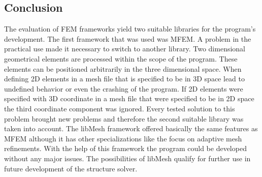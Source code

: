  \subsection{Conclusion}
  The evaluation of FEM frameworks yield two suitable libraries for the program's development. The first framework that was used was MFEM. A problem in the practical use made it necessary to switch to another library. Two dimensional geometrical elements are processed within the scope of the program. These elements can be positioned arbitrarily in the three dimensional space. When defining 2D elements in a mesh file that is specified to be in 3D space lead to undefined behavior or even the crashing of the program. If 2D elements were specified with 3D coordinate in a mesh file that were specified to be in 2D space the third coordinate component was ignored. Every tested solution to this problem brought new problems and therefore the second suitable library was taken into account. The libMesh framework offered basically the same features as MFEM although it has other specializations like the focus on adaptive mesh refinements. With the help of this framework the program could be developed without any major issues. The possibilities of libMesh qualify for further use in future development of the structure solver.
  
